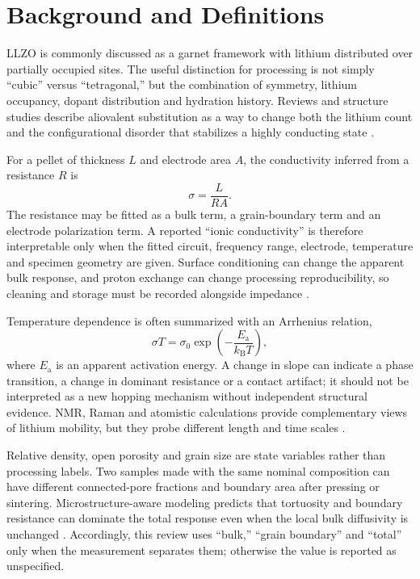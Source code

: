 \section{Background and Definitions}
\label{sec:background}

LLZO is commonly discussed as a garnet framework with lithium distributed over partially occupied sites. The useful distinction for processing is not simply “cubic” versus “tetragonal,” but the combination of symmetry, lithium occupancy, dopant distribution and hydration history. Reviews and structure studies describe aliovalent substitution as a way to change both the lithium count and the configurational disorder that stabilizes a highly conducting state \cite{cao2019modeling,raju2021crystal,kim2020research}.

For a pellet of thickness $L$ and electrode area $A$, the conductivity inferred from a resistance $R$ is
\begin{equation}
  \sigma = \frac{L}{RA}.
\end{equation}
The resistance may be fitted as a bulk term, a grain-boundary term and an electrode polarization term. A reported “ionic conductivity” is therefore interpretable only when the fitted circuit, frequency range, electrode, temperature and specimen geometry are given. Surface conditioning can change the apparent bulk response, and proton exchange can change processing reproducibility, so cleaning and storage must be recorded alongside impedance \cite{grissa2020impact,rosen2021controlling,uhlenbruck2018reactions}.

Temperature dependence is often summarized with an Arrhenius relation,
\begin{equation}
  \sigma T = \sigma_{0} \exp\left(-\frac{E_{\mathrm{a}}}{k_{\mathrm{B}}T}\right),
\end{equation}
where $E_{\mathrm{a}}$ is an apparent activation energy. A change in slope can indicate a phase transition, a change in dominant resistance or a contact artifact; it should not be interpreted as a new hopping mechanism without independent structural evidence. NMR, Raman and atomistic calculations provide complementary views of lithium mobility, but they probe different length and time scales \cite{kuhn2011li,larraz2015nmr,miyagawa2026raman,heo2021microstructural,ilina2023recent}.

Relative density, open porosity and grain size are state variables rather than processing labels. Two samples made with the same nominal composition can have different connected-pore fractions and boundary area after pressing or sintering. Microstructure-aware modeling predicts that tortuosity and boundary resistance can dominate the total response even when the local bulk diffusivity is unchanged \cite{heo2021microstructural,gao2021revealing,grissa2020impact}. Accordingly, this review uses “bulk,” “grain boundary” and “total” only when the measurement separates them; otherwise the value is reported as unspecified.

